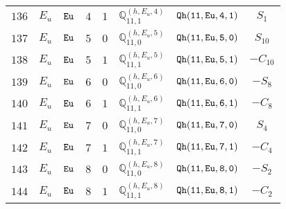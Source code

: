 \documentclass[fleqn,8pt]{jsarticle}
\begin{document}
\begin{table}[ht!]
\begin{center}
\begin{tabular}{cccccccc}
$ 136 $ & $ E_{u} $ & $ {\tt Eu} $ & $ 4 $ & $ 1 $ & $ \mathbb{Q}_{11,1}^{(h,E_{u},4)} $ & $ {\tt Qh(11,Eu,4,1)} $ & $ S_{1} $ \\
$ 137 $ & $ E_{u} $ & $ {\tt Eu} $ & $ 5 $ & $ 0 $ & $ \mathbb{Q}_{11,0}^{(h,E_{u},5)} $ & $ {\tt Qh(11,Eu,5,0)} $ & $ S_{10} $ \\
$ 138 $ & $ E_{u} $ & $ {\tt Eu} $ & $ 5 $ & $ 1 $ & $ \mathbb{Q}_{11,1}^{(h,E_{u},5)} $ & $ {\tt Qh(11,Eu,5,1)} $ & $ - C_{10} $ \\
$ 139 $ & $ E_{u} $ & $ {\tt Eu} $ & $ 6 $ & $ 0 $ & $ \mathbb{Q}_{11,0}^{(h,E_{u},6)} $ & $ {\tt Qh(11,Eu,6,0)} $ & $ - S_{8} $ \\
$ 140 $ & $ E_{u} $ & $ {\tt Eu} $ & $ 6 $ & $ 1 $ & $ \mathbb{Q}_{11,1}^{(h,E_{u},6)} $ & $ {\tt Qh(11,Eu,6,1)} $ & $ - C_{8} $ \\
$ 141 $ & $ E_{u} $ & $ {\tt Eu} $ & $ 7 $ & $ 0 $ & $ \mathbb{Q}_{11,0}^{(h,E_{u},7)} $ & $ {\tt Qh(11,Eu,7,0)} $ & $ S_{4} $ \\
$ 142 $ & $ E_{u} $ & $ {\tt Eu} $ & $ 7 $ & $ 1 $ & $ \mathbb{Q}_{11,1}^{(h,E_{u},7)} $ & $ {\tt Qh(11,Eu,7,1)} $ & $ - C_{4} $ \\
$ 143 $ & $ E_{u} $ & $ {\tt Eu} $ & $ 8 $ & $ 0 $ & $ \mathbb{Q}_{11,0}^{(h,E_{u},8)} $ & $ {\tt Qh(11,Eu,8,0)} $ & $ - S_{2} $ \\
$ 144 $ & $ E_{u} $ & $ {\tt Eu} $ & $ 8 $ & $ 1 $ & $ \mathbb{Q}_{11,1}^{(h,E_{u},8)} $ & $ {\tt Qh(11,Eu,8,1)} $ & $ - C_{2} $ \\
 \hline \hline
\end{tabular}
\end{center}
\end{table}
\end{document}
